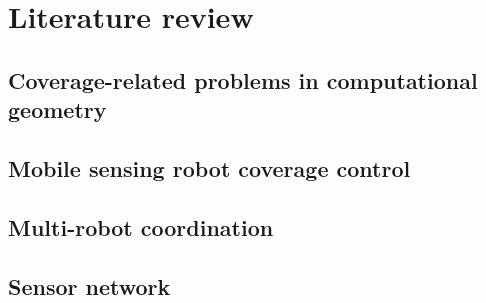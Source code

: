 \section{Literature review} 

\subsection{Coverage-related problems in computational geometry}

\subsection{Mobile sensing robot coverage control}

\subsection{Multi-robot coordination}

\subsection{Sensor network}

